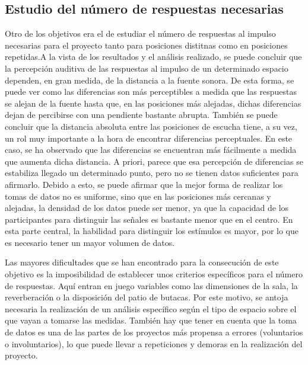 \documentclass[11pt,a4paper]{book}
\begin{document}
        \subsection*{Estudio del número de respuestas necesarias}
            Otro de los objetivos era el de estudiar el número de respuestas al impulso necesarias para el proyecto tanto para posiciones distitnas como en posiciones repetidas.A la vista de los resultados y el análisis realizado, se puede concluir que la percepción auditiva de las respuestas al impulso de un determinado espacio dependen, en gran medida, de la distancia a la fuente sonora. De esta forma, se puede ver como las diferencias son más perceptibles a medida que las respuestas se alejan de la fuente hasta que, en las posiciones más alejadas, dichas diferencias dejan de percibirse con una pendiente bastante abrupta. También se puede concluir que la distancia absoluta entre las posiciones de escucha tiene, a su vez, un rol muy importante a la hora de encontrar diferencias perceptuales. En este caso, se ha observado que las diferencias se encuentran más fácilmente a medida que aumenta dicha distancia. A priori, parece que esa percepción de diferencias se estabiliza llegado un determinado punto, pero no se tienen datos suficientes para afirmarlo. Debido a esto, se puede afirmar que la mejor forma de realizar los tomas de datos no es uniforme, sino que en las posiciones más cercanas y alejadas, la densidad de los datos puede ser menor, ya que la capacidad de los participantes para distinguir las señales es bastante menor que en el centro. En esta parte central, la habilidad para distinguir los estímulos es mayor, por lo que es necesario tener un mayor volumen de datos. 
    
            Las mayores dificultades que se han encontrado para la consecución de este objetivo es la imposibilidad de establecer unos criterios específicos para el número de respuestas. Aquí entran en juego variables como las dimensiones de la sala, la reverberación o la disposición del patio de butacas. Por este motivo, se antoja necesaria la realización de un análisis específico según el tipo de espacio sobre el que vayan a tomarse las medidas. También hay que tener en cuenta que la toma de datos es una de las partes de los proyectos más propensa a errores (voluntarios o involuntarios), lo que puede llevar a repeticiones y demoras en la realización del proyecto.
        
\end{document}
